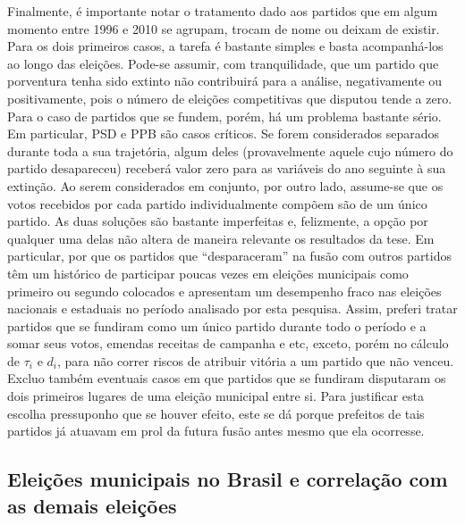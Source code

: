 
Finalmente, é importante notar o tratamento dado aos partidos que em algum momento entre 1996 e 2010 se agrupam, trocam de nome ou deixam de existir. Para os dois primeiros casos, a tarefa é bastante simples e basta acompanhá-los ao longo das eleições. Pode-se assumir, com tranquilidade, que um partido que porventura tenha sido extinto não contribuirá para a análise, negativamente ou positivamente, pois o número de eleições competitivas que disputou tende a zero. Para o caso de partidos que se fundem, porém, há um problema bastante sério. Em particular, PSD e PPB são casos críticos. Se forem considerados separados durante toda a sua trajetória, algum deles (provavelmente aquele cujo número do partido desapareceu) receberá valor zero para as variáveis do ano seguinte à sua extinção. Ao serem considerados em conjunto, por outro lado, assume-se que os votos recebidos por cada partido individualmente compõem são de um único partido. As duas soluções são bastante imperfeitas e, felizmente, a opção por qualquer uma delas não altera de maneira relevante os resultados da tese. Em particular, por que os partidos que ``desparaceram'' na fusão com outros partidos têm um histórico de participar poucas vezes em eleições municipais como primeiro ou segundo colocados e apresentam um desempenho fraco nas eleições nacionais e estaduais no período analisado por esta pesquisa. Assim, preferi tratar partidos que se fundiram como um único partido durante todo o período e a somar seus votos, emendas receitas de campanha e etc, exceto, porém no cálculo de $\tau_{i}$ e $d_{i}$, para não correr riscos de atribuir vitória a um partido que não venceu. Excluo também eventuais casos em que partidos que se fundiram disputaram os dois primeiros lugares de uma eleição municipal entre si. Para justificar esta escolha pressuponho que se houver efeito, este se dá porque prefeitos de tais partidos já atuavam em prol da futura fusão antes mesmo que ela ocorresse.

\subsection{Eleições municipais no Brasil e correlação com as demais eleições}

